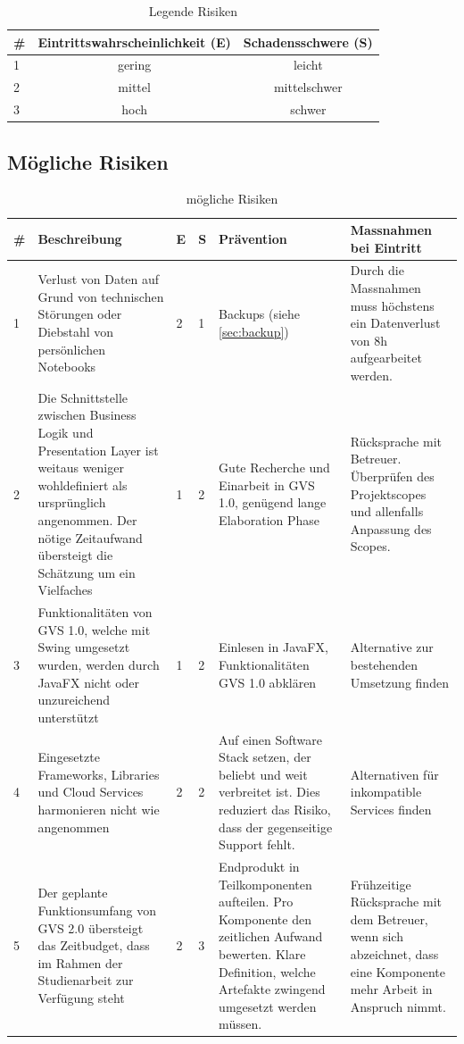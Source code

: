 \documentclass[11pt,a4paper,english,oneside]{book}
\numberwithin{equation}{chapter}
\begin{document}
	\begin{table}[h!]
		\centering
		\begin{tabular}{l c c}
			\toprule 
			\# & Eintrittswahrscheinlichkeit (E) & Schadensschwere (S) \\
			\toprule 
			1 & gering & leicht  \\
			2 & mittel & mittelschwer \\
			3 & hoch & schwer \\
			\bottomrule 
		\end{tabular} 
		\caption{Legende Risiken} 
	\end{table}
	\begin{landscape}		
		\subsection{Mögliche Risiken}
		\begin{table}[h!]
			\centering
			\begin{tabularx}{\linewidth}{l X l l X X}
				\toprule 
				\# & Beschreibung & E & S & Prävention & Massnahmen bei Eintritt \\
				\toprule 
				1 & Verlust von Daten auf Grund von technischen Störungen oder Diebstahl von persönlichen Notebooks & 2 & 1 & Backups (siehe \ref{sec:backup}) & Durch die Massnahmen muss höchstens ein Datenverlust von 8h aufgearbeitet werden. \\
				\midrule
				2 & Die Schnittstelle zwischen Business Logik und Presentation Layer ist weitaus weniger wohldefiniert als ursprünglich angenommen. Der nötige Zeitaufwand übersteigt die Schätzung um ein Vielfaches & 1 & 2 & Gute Recherche und Einarbeit in GVS 1.0, genügend lange Elaboration Phase & Rücksprache mit Betreuer. Überprüfen des Projektscopes und allenfalls Anpassung des Scopes. \\
				\midrule
				3 & Funktionalitäten von GVS 1.0, welche mit Swing umgesetzt wurden, werden durch JavaFX nicht oder unzureichend unterstützt & 1 & 2 & Einlesen in JavaFX, Funktionalitäten GVS 1.0 abklären & Alternative zur bestehenden Umsetzung finden \\
				\midrule
				4 & Eingesetzte Frameworks, Libraries und Cloud Services harmonieren nicht wie angenommen & 2 & 2 & Auf einen Software Stack setzen, der beliebt und weit verbreitet ist. Dies reduziert das Risiko, dass der gegenseitige Support fehlt. & Alternativen für inkompatible Services finden \\  
				\midrule 
				5 & Der geplante Funktionsumfang von GVS 2.0 übersteigt das Zeitbudget, dass im Rahmen der Studienarbeit zur Verfügung steht & 2 & 3 & Endprodukt in Teilkomponenten aufteilen. Pro Komponente den zeitlichen Aufwand bewerten. Klare Definition, welche Artefakte zwingend umgesetzt werden müssen. & Frühzeitige Rücksprache mit dem Betreuer, wenn sich abzeichnet, dass eine Komponente mehr Arbeit in Anspruch nimmt. \\  
				\bottomrule 
			\end{tabularx} 
			\caption{mögliche Risiken} 
		\end{table}
	\end{landscape}
	
\end{document}
